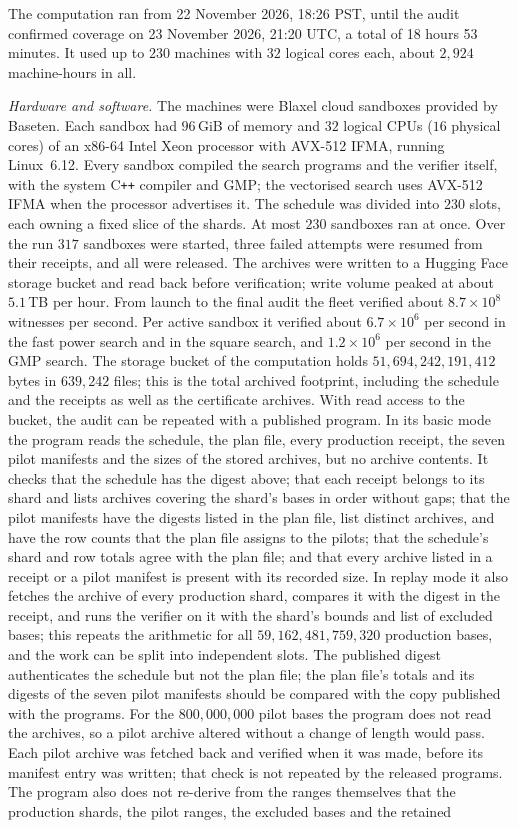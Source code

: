 \documentclass[11pt,colorlinks]{charlie}
\begin{document}
The computation ran from 22 November 2026, 18:26 PST, until the audit confirmed coverage on 23 November 2026, 21:20 UTC, a total of 18 hours 53 minutes. It used up to $230$ machines with $32$ logical cores each, about $2{,}924$ machine-hours in all.

\emph{Hardware and software.} The machines were Blaxel cloud sandboxes provided by Baseten. Each sandbox had $96$\,GiB of memory and $32$ logical CPUs ($16$ physical cores) of an x86-64 Intel Xeon processor with AVX-512 IFMA, running Linux~6.12. Every sandbox compiled the search programs and the verifier itself, with the system C\texttt{++} compiler and GMP; the vectorised search uses AVX-512 IFMA when the processor advertises it. The schedule was divided into $230$ slots, each owning a fixed slice of the shards. At most $230$ sandboxes ran at once. Over the run $317$ sandboxes were started, three failed attempts were resumed from their receipts, and all were released. The archives were written to a Hugging Face storage bucket and read back before verification; write volume peaked at about $5.1$\,TB per hour. From launch to the final audit the fleet verified about $8.7\times10^8$ witnesses per second. Per active sandbox it verified about $6.7\times10^6$ per second in the fast power search and in the square search, and $1.2\times10^6$ per second in the GMP search. The storage bucket of the computation holds $51{,}694{,}242{,}191{,}412$ bytes in $639{,}242$ files; this is the total archived footprint, including the schedule and the receipts as well as the certificate archives. With read access to the bucket, the audit can be repeated with a published program. In its basic mode the program reads the schedule, the plan file, every production receipt, the seven pilot manifests and the sizes of the stored archives, but no archive contents. It checks that the schedule has the digest above; that each receipt belongs to its shard and lists archives covering the shard's bases in order without gaps; that the pilot manifests have the digests listed in the plan file, list distinct archives, and have the row counts that the plan file assigns to the pilots; that the schedule's shard and row totals agree with the plan file; and that every archive listed in a receipt or a pilot manifest is present with its recorded size. In replay mode it also fetches the archive of every production shard, compares it with the digest in the receipt, and runs the verifier on it with the shard's bounds and list of excluded bases; this repeats the arithmetic for all $59{,}162{,}481{,}759{,}320$ production bases, and the work can be split into independent slots. The published digest authenticates the schedule but not the plan file; the plan file's totals and its digests of the seven pilot manifests should be compared with the copy published with the programs. For the $800{,}000{,}000$ pilot bases the program does not read the archives, so a pilot archive altered without a change of length would pass. Each pilot archive was fetched back and verified when it was made, before its manifest entry was written; that check is not repeated by the released programs. The program also does not re-derive from the ranges themselves that the production shards, the pilot ranges, the excluded bases and the retained 
\end{document}
